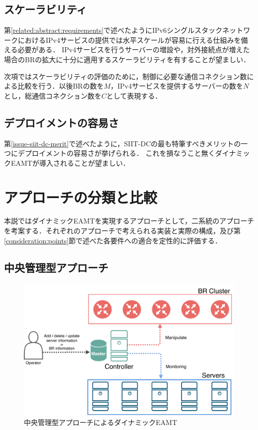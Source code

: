 \subsection{スケーラビリティ}
\label{consideration:points:scalability}

第\ref{related:abstract:requirements}で述べたようにIPv6シングルスタックネットワークにおけるIPv4サービスの提供では水平スケールが容易に行える仕組みを備える必要がある．
IPv4サービスを行うサーバーの増設や，対外接続点が増えた場合のBRの拡大に十分に適用するスケーラビリティを有することが望ましい．

次項ではスケーラビリティの評価のために，制御に必要な通信コネクション数による比較を行う．以後BRの数を$M$，IPv4サービスを提供するサーバーの数を$N$とし，総通信コネクション数を$C$として表現する．


\subsection{デプロイメントの容易さ}
第\ref{issue-siit-dc-merit}で述べたように，SIIT-DCの最も特筆すべきメリットの一つにデプロイメントの容易さが挙げられる．
これを損なうこと無くダイナミックEAMTが導入されることが望ましい．


\section{アプローチの分類と比較}
\label{consideration:approach}
本説ではダイナミックEAMTを実現するアプローチとして，二系統のアプローチを考案する．それぞれのアプローチで考えられる実装と実際の構成，及び第\ref{consideration:points}節で述べた各要件への適合を定性的に評価する．



\subsection{中央管理型アプローチ}
\label{consideration:approach:centerized}

\begin{figure}[h]
    \begin{center}
      \includegraphics[width=12cm,pagebox=cropbox,clip]{img/approach_centerized_model.pdf}
    \end{center}
    \caption{中央管理型アプローチによるダイナミックEAMT}
    \label{fig:approach_centerized_model}
\end{figure}

